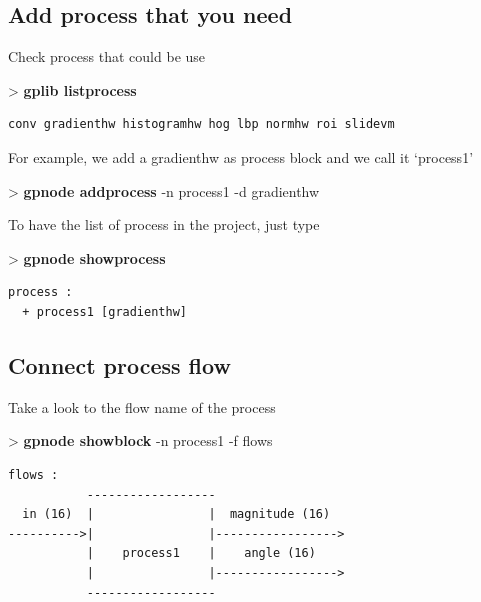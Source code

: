 \documentclass[10pt,a4paper]{article}
\begin{document}
\subsection{Add process that you need}
Check process that could be use

\begin{sample}
> \textbf{gplib listprocess}
\begin{Verbatim}
conv gradienthw histogramhw hog lbp normhw roi slidevm
\end{Verbatim}
\end{sample}

For example, we add a gradienthw as process block and we call it `process1'

\begin{sample}
> \textbf{gpnode addprocess} -n process1 -d gradienthw
\end{sample}

To have the list of process in the project, just type

\begin{sample}
> \textbf{gpnode showprocess}
\begin{Verbatim}
process :
  + process1 [gradienthw]
\end{Verbatim}
\end{sample}
  

\subsection{Connect process flow}

Take a look to the flow name of the process

\begin{sample}
> \textbf{gpnode showblock} -n process1 -f flows
\begin{Verbatim}
flows :
           ------------------
  in (16)  |                |  magnitude (16)
---------->|                |----------------->
           |    process1    |    angle (16)
           |                |----------------->
           ------------------
\end{Verbatim}
\end{sample}
\end{document}
